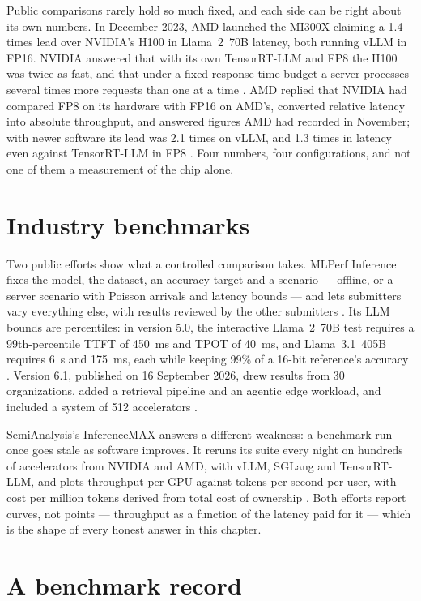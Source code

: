 Public comparisons rarely hold so much fixed, and each side can be right about
its own numbers. In December 2023, AMD launched the MI300X claiming a 1.4 times
lead over NVIDIA's H100 in Llama~2~70B latency, both running vLLM in FP16. NVIDIA
answered that with its own TensorRT-LLM and FP8 the H100 was twice as fast, and
that under a fixed response-time budget a server processes several times more
requests than one at a time \cite{nvidia2023h100trtllm}. AMD replied that
NVIDIA had compared FP8 on its hardware with FP16 on AMD's, converted relative
latency into absolute throughput, and answered figures AMD had recorded in
November; with newer software its lead was 2.1 times on vLLM, and 1.3 times in
latency even against TensorRT-LLM in FP8 \cite{amd2023mi300x}. Four numbers, four configurations,
and not one of them a measurement of the chip alone.

\section{Industry benchmarks}

Two public efforts show what a controlled comparison takes. MLPerf Inference
fixes the model, the dataset, an accuracy target and a scenario --- offline, or
a server scenario with Poisson arrivals and latency bounds --- and lets
submitters vary everything else, with results reviewed by the other submitters
\cite{reddi2020mlperf}. Its LLM bounds are percentiles: in version 5.0, the
interactive Llama~2~70B test requires a 99th-percentile TTFT of 450~ms and TPOT of
40~ms, and Llama~3.1~405B requires 6~s and 175~ms, each while keeping 99\% of
a 16-bit reference's accuracy \cite{mlcommons2025llmv5}. Version 6.1, published
on 16 September 2026, drew results from 30 organizations, added a retrieval
pipeline and an agentic edge workload, and included a system of 512 accelerators
\cite{mlcommons2026v61}.

SemiAnalysis's InferenceMAX answers a different weakness: a benchmark run once
goes stale as software improves. It reruns its suite every night on hundreds of
accelerators from NVIDIA and AMD, with vLLM, SGLang and TensorRT-LLM, and plots
throughput per GPU against tokens per second per user, with cost per million
tokens derived from total cost of ownership \cite{semianalysis2025inferencemax}.
Both efforts report curves, not points --- throughput as a function of the
latency paid for it --- which is the shape of every honest answer in this chapter.

\section{A benchmark record}

